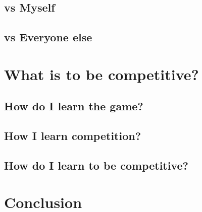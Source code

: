 \documentclass[a4paper,conference]{IEEEtran}
\begin{document}
\subsection{vs Myself}
\subsection{vs Everyone else}

\section{What is to be competitive?}
\subsection{How do I learn the game?}
\subsection{How I learn competition?}
\subsection{How do I learn to be competitive?}

\section{Conclusion}














%
%
%
\balance







\end{document}
